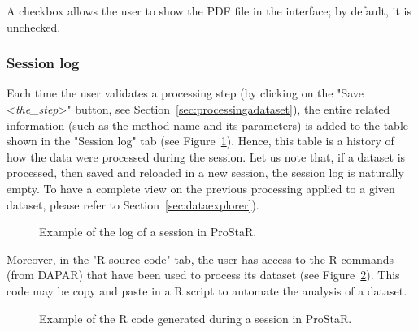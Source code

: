 \documentclass[12pt]{article}
\begin{document}
{A checkbox allows the user to show the PDF file in the interface; by default, it is unchecked.

\subsubsection{Session log}\label{sec:sessionlog}

Each time the user validates a processing step (by clicking on the 
"Save <\emph{the\_step}>" button, see Section~\ref{sec:processingadataset}), 
the entire related information  (such as the method name and its parameters) 
is added to the table shown in the "Session log" tab 
(see Figure~\ref{fig:sessionlog}). Hence, this table is a history of how the 
data were processed during the session. 
Let us note that, if a dataset is processed, then saved and reloaded in a 
new session, the session log is naturally empty. To have a complete view on 
the previous processing applied to a given dataset, please refer to 
Section~\ref{sec:dataexplorer}).

\begin{figure}[b]
\centering
{}
\caption{Example of the log of a session in ProStaR.}\label{fig:sessionlog}
\end {figure}

Moreover, in the "R source code" tab, the user has access to the R commands 
(from DAPAR) that have been used to process its dataset 
(see Figure~\ref{fig:Rcode}). This code may be copy and paste in a R script to 
automate the analysis of a dataset.

\begin{figure}[b]
\centering
{}
\caption{Example of the R code generated during a 
session in ProStaR.}\label{fig:Rcode}
\end {figure}


}
\end{document}
